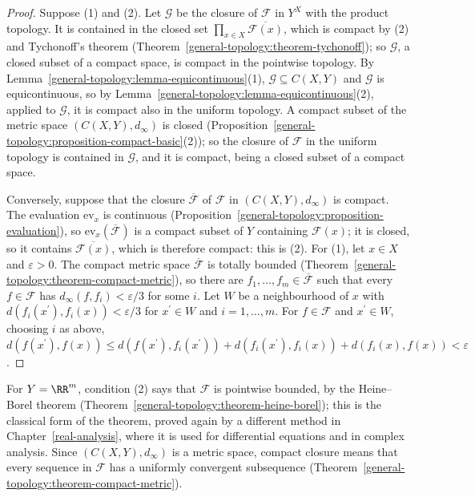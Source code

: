 \begin{proof}
Suppose (1) and (2). Let $\mathcal{G}$ be the closure of $\mathcal{F}$ in $Y^X$ with the product topology. It is contained in the closed set $\prod_{x \in X}\overline{\mathcal{F}(x)}$, which is
compact by (2) and Tychonoff's theorem (Theorem~\ref{general-topology:theorem-tychonoff}); so $\mathcal{G}$, a closed subset of a compact space, is compact in the pointwise topology. By
Lemma~\ref{general-topology:lemma-equicontinuous}(1), $\mathcal{G} \subseteq C(X, Y)$ and $\mathcal{G}$ is equicontinuous, so by Lemma~\ref{general-topology:lemma-equicontinuous}(2), applied to
$\mathcal{G}$, it is compact also in the uniform topology. A compact subset of the metric space $(C(X, Y), d_\infty)$ is closed (Proposition~\ref{general-topology:proposition-compact-basic}(2)); so
the closure of $\mathcal{F}$ in the uniform topology is contained in $\mathcal{G}$, and it is compact, being a closed subset of a compact space.

Conversely, suppose that the closure $\overline{\mathcal{F}}$ of $\mathcal{F}$ in $(C(X, Y), d_\infty)$ is compact. The evaluation $\mathrm{ev}_x$ is continuous
(Proposition~\ref{general-topology:proposition-evaluation}), so $\mathrm{ev}_x(\overline{\mathcal{F}})$ is a compact subset of $Y$ containing $\mathcal{F}(x)$; it is closed, so it contains
$\overline{\mathcal{F}(x)}$, which is therefore compact: this is (2). For (1), let $x \in X$ and $\varepsilon > 0$. The compact metric space $\overline{\mathcal{F}}$ is totally bounded
(Theorem~\ref{general-topology:theorem-compact-metric}), so there are $f_1, \ldots, f_m \in \overline{\mathcal{F}}$ such that every $f \in \mathcal{F}$ has $d_\infty(f, f_i) < \varepsilon/3$ for some
$i$. Let $W$ be a neighbourhood of $x$ with $d(f_i(x^{\prime}), f_i(x)) < \varepsilon/3$ for $x^{\prime} \in W$ and $i = 1, \ldots, m$. For $f \in \mathcal{F}$ and $x^{\prime} \in W$, choosing $i$ as above,
$d(f(x^{\prime}), f(x)) \leq d(f(x^{\prime}), f_i(x^{\prime})) + d(f_i(x^{\prime}), f_i(x)) + d(f_i(x), f(x)) < \varepsilon$.
\end{proof}

For $Y = \RR^m$, condition (2) says that $\mathcal{F}$ is pointwise bounded, by the Heine--Borel theorem (Theorem~\ref{general-topology:theorem-heine-borel}); this is the classical form of the theorem,
proved again by a different method in Chapter~\ref{real-analysis}, where it is used for differential equations and in complex analysis. Since $(C(X, Y), d_\infty)$ is a metric space, compact
closure means that every sequence in $\mathcal{F}$ has a uniformly convergent subsequence (Theorem~\ref{general-topology:theorem-compact-metric}).

